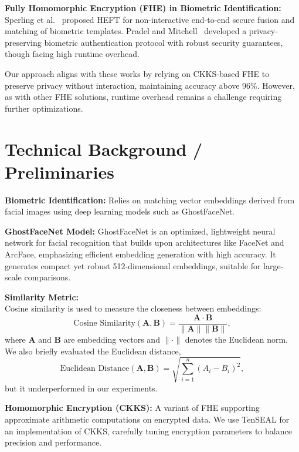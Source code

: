 \documentclass[12pt,a4paper]{article}
\begin{document}
\textbf{Fully Homomorphic Encryption (FHE) in Biometric Identification:}\\
Sperling et al.~\cite{Sperling2022} proposed HEFT for non-interactive end-to-end secure fusion and matching 
of biometric templates. Pradel and Mitchell~\cite{Pradel2021} developed a privacy-preserving biometric 
authentication protocol with robust security guarantees, though facing high runtime overhead.

Our approach aligns with these works by relying on CKKS-based FHE to preserve privacy without interaction, 
maintaining accuracy above 96\%. However, as with other FHE solutions, runtime overhead remains a 
challenge requiring further optimizations.

\section{Technical Background / Preliminaries}

\textbf{Biometric Identification:} Relies on matching vector embeddings derived from facial images 
using deep learning models such as GhostFaceNet.

\textbf{GhostFaceNet Model:} GhostFaceNet is an optimized, lightweight neural network for facial 
recognition that builds upon architectures like FaceNet and ArcFace, emphasizing efficient embedding 
generation with high accuracy. It generates compact yet robust 512-dimensional embeddings, suitable 
for large-scale comparisons.

\textbf{Similarity Metric:}\\
Cosine similarity is used to measure the closeness between embeddings:
\[
\text{Cosine Similarity}(\mathbf{A}, \mathbf{B}) 
= \frac{\mathbf{A} \cdot \mathbf{B}}{\|\mathbf{A}\|\|\mathbf{B}\|},
\]
where \(\mathbf{A}\) and \(\mathbf{B}\) are embedding vectors and \(\|\cdot\|\) denotes the Euclidean norm.
We also briefly evaluated the Euclidean distance,
\[
\text{Euclidean Distance}(\mathbf{A}, \mathbf{B}) 
= \sqrt{\sum_{i=1}^{n}(A_i - B_i)^2},
\]
but it underperformed in our experiments.

\textbf{Homomorphic Encryption (CKKS):} A variant of FHE supporting approximate arithmetic computations 
on encrypted data. We use TenSEAL for an implementation of CKKS, carefully tuning encryption parameters 
to balance precision and performance.
\end{document}

